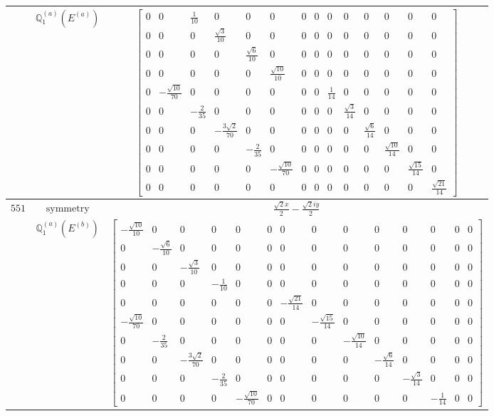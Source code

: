 \documentclass[fleqn,8pt,landscape]{jsarticle}
\begin{document}
\begin{longtable}{ccc}
$  $ & $ \mathbb{Q}_{1}^{(a)}(E^{(a)}) $ & $ \begin{bmatrix} 0 & 0 & \frac{1}{10} & 0 & 0 & 0 & 0 & 0 & 0 & 0 & 0 & 0 & 0 & 0 \\ 0 & 0 & 0 & \frac{\sqrt{3}}{10} & 0 & 0 & 0 & 0 & 0 & 0 & 0 & 0 & 0 & 0 \\ 0 & 0 & 0 & 0 & \frac{\sqrt{6}}{10} & 0 & 0 & 0 & 0 & 0 & 0 & 0 & 0 & 0 \\ 0 & 0 & 0 & 0 & 0 & \frac{\sqrt{10}}{10} & 0 & 0 & 0 & 0 & 0 & 0 & 0 & 0 \\ 0 & - \frac{\sqrt{10}}{70} & 0 & 0 & 0 & 0 & 0 & 0 & \frac{1}{14} & 0 & 0 & 0 & 0 & 0 \\ 0 & 0 & - \frac{2}{35} & 0 & 0 & 0 & 0 & 0 & 0 & \frac{\sqrt{3}}{14} & 0 & 0 & 0 & 0 \\ 0 & 0 & 0 & - \frac{3 \sqrt{2}}{70} & 0 & 0 & 0 & 0 & 0 & 0 & \frac{\sqrt{6}}{14} & 0 & 0 & 0 \\ 0 & 0 & 0 & 0 & - \frac{2}{35} & 0 & 0 & 0 & 0 & 0 & 0 & \frac{\sqrt{10}}{14} & 0 & 0 \\ 0 & 0 & 0 & 0 & 0 & - \frac{\sqrt{10}}{70} & 0 & 0 & 0 & 0 & 0 & 0 & \frac{\sqrt{15}}{14} & 0 \\ 0 & 0 & 0 & 0 & 0 & 0 & 0 & 0 & 0 & 0 & 0 & 0 & 0 & \frac{\sqrt{21}}{14} \end{bmatrix} $ \\ \hline
$ 551 $ & $ \text{symmetry} $ & $ \frac{\sqrt{2} x}{2} - \frac{\sqrt{2} i y}{2} $ \\
$  $ & $ \mathbb{Q}_{1}^{(a)}(E^{(b)}) $ & $ \begin{bmatrix} - \frac{\sqrt{10}}{10} & 0 & 0 & 0 & 0 & 0 & 0 & 0 & 0 & 0 & 0 & 0 & 0 & 0 \\ 0 & - \frac{\sqrt{6}}{10} & 0 & 0 & 0 & 0 & 0 & 0 & 0 & 0 & 0 & 0 & 0 & 0 \\ 0 & 0 & - \frac{\sqrt{3}}{10} & 0 & 0 & 0 & 0 & 0 & 0 & 0 & 0 & 0 & 0 & 0 \\ 0 & 0 & 0 & - \frac{1}{10} & 0 & 0 & 0 & 0 & 0 & 0 & 0 & 0 & 0 & 0 \\ 0 & 0 & 0 & 0 & 0 & 0 & - \frac{\sqrt{21}}{14} & 0 & 0 & 0 & 0 & 0 & 0 & 0 \\ - \frac{\sqrt{10}}{70} & 0 & 0 & 0 & 0 & 0 & 0 & - \frac{\sqrt{15}}{14} & 0 & 0 & 0 & 0 & 0 & 0 \\ 0 & - \frac{2}{35} & 0 & 0 & 0 & 0 & 0 & 0 & - \frac{\sqrt{10}}{14} & 0 & 0 & 0 & 0 & 0 \\ 0 & 0 & - \frac{3 \sqrt{2}}{70} & 0 & 0 & 0 & 0 & 0 & 0 & - \frac{\sqrt{6}}{14} & 0 & 0 & 0 & 0 \\ 0 & 0 & 0 & - \frac{2}{35} & 0 & 0 & 0 & 0 & 0 & 0 & - \frac{\sqrt{3}}{14} & 0 & 0 & 0 \\ 0 & 0 & 0 & 0 & - \frac{\sqrt{10}}{70} & 0 & 0 & 0 & 0 & 0 & 0 & - \frac{1}{14} & 0 & 0 \end{bmatrix} $ \\ \hline

\end{longtable}
\end{document}
